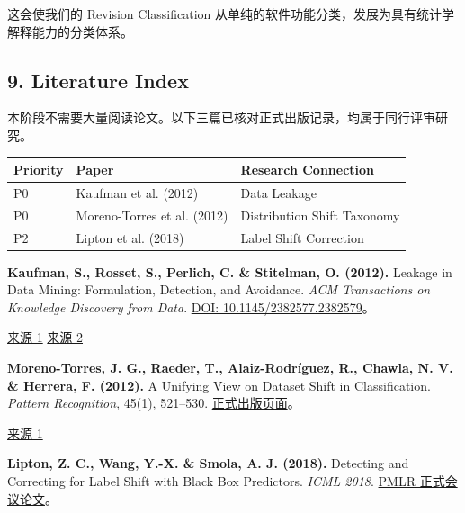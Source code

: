 这会使我们的 Revision Classification 从单纯的软件功能分类，发展为具有统计学解释能力的分类体系。

\hypertarget{part-2-23-0001-literature-index}{%
\subsection{9. Literature Index}\label{part-2-23-0001-literature-index}}

本阶段不需要大量阅读论文。以下三篇已核对正式出版记录，均属于同行评审研究。

\begin{readertable}
\begin{longtable}[]{@{}
  >{\raggedright\arraybackslash}p{}
  >{\raggedright\arraybackslash}p{}
  >{\raggedright\arraybackslash}p{}@{}}
\toprule
Priority & Paper & Research Connection \\
\midrule
\endhead
P0 & Kaufman et al. (2012) & Data Leakage \\
P0 & Moreno-Torres et al. (2012) & Distribution Shift Taxonomy \\
P2 & Lipton et al. (2018) & Label Shift Correction \\
\bottomrule
\end{longtable}
\end{readertable}

\textbf{Kaufman, S., Rosset, S., Perlich, C. \& Stitelman, O. (2012).} Leakage in Data Mining: Formulation, Detection, and Avoidance. \emph{ACM Transactions on Knowledge Discovery from Data}. \href{https://doi.org/10.1145/2382577.2382579}{DOI: 10.1145/2382577.2382579}。

\href{https://doi.org/10.1145/2382577.2382579?trk=article-ssr-frontend-pulse_little-text-block}{来源 1} \href{https://cris.tau.ac.il/en/publications/leakage-in-data-mining-formulation-detection-and-avoidance/}{来源 2}

\textbf{Moreno-Torres, J. G., Raeder, T., Alaiz-Rodríguez, R., Chawla, N. V. \& Herrera, F. (2012).} A Unifying View on Dataset Shift in Classification. \emph{Pattern Recognition}, 45(1), 521--530. \href{https://www.sciencedirect.com/science/article/pii/S0031320311002901}{正式出版页面}。

\href{https://www.sciencedirect.com/science/article/pii/S0031320311002901}{来源 1}

\textbf{Lipton, Z. C., Wang, Y.-X. \& Smola, A. J. (2018).} Detecting and Correcting for Label Shift with Black Box Predictors. \emph{ICML 2018}. \href{https://proceedings.mlr.press/v80/lipton18a.html}{PMLR 正式会议论文}。

